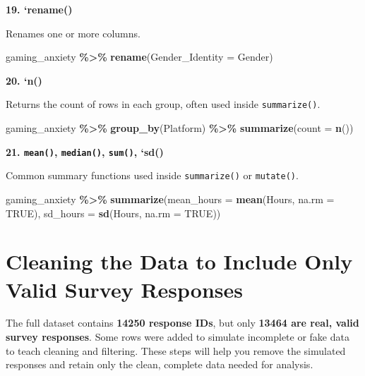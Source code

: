 \documentclass[
]{book}
\newenvironment{Shaded}{\begin{snugshade}}{\end{snugshade}}
\newcommand{\AttributeTok}[1]{\textcolor[rgb]{0.13,0.29,0.53}{#1}}
\newcommand{\ConstantTok}[1]{\textcolor[rgb]{0.56,0.35,0.01}{#1}}
\newcommand{\FunctionTok}[1]{\textcolor[rgb]{0.13,0.29,0.53}{\textbf{#1}}}
\newcommand{\NormalTok}[1]{#1}
\newcommand{\SpecialCharTok}[1]{\textcolor[rgb]{0.81,0.36,0.00}{\textbf{#1}}}
\begin{document}
\textbf{19. `rename()}

Renames one or more columns.

\begin{Shaded}
\begin{Highlighting}[]
\NormalTok{gaming\_anxiety }\SpecialCharTok{\%\textgreater{}\%}
  \FunctionTok{rename}\NormalTok{(}\AttributeTok{Gender\_Identity =}\NormalTok{ Gender)}
\end{Highlighting}
\end{Shaded}

\textbf{20. `n()}

Returns the count of rows in each group, often used inside \texttt{summarize()}.

\begin{Shaded}
\begin{Highlighting}[]
\NormalTok{gaming\_anxiety }\SpecialCharTok{\%\textgreater{}\%}
  \FunctionTok{group\_by}\NormalTok{(Platform) }\SpecialCharTok{\%\textgreater{}\%}
  \FunctionTok{summarize}\NormalTok{(}\AttributeTok{count =} \FunctionTok{n}\NormalTok{())}
\end{Highlighting}
\end{Shaded}

\textbf{21. \texttt{mean()}, \texttt{median()}, \texttt{sum()}, `sd()}

Common summary functions used inside \texttt{summarize()} or \texttt{mutate()}.

\begin{Shaded}
\begin{Highlighting}[]
\NormalTok{gaming\_anxiety }\SpecialCharTok{\%\textgreater{}\%}
  \FunctionTok{summarize}\NormalTok{(}\AttributeTok{mean\_hours =} \FunctionTok{mean}\NormalTok{(Hours, }\AttributeTok{na.rm =} \ConstantTok{TRUE}\NormalTok{),}
            \AttributeTok{sd\_hours =} \FunctionTok{sd}\NormalTok{(Hours, }\AttributeTok{na.rm =} \ConstantTok{TRUE}\NormalTok{))}
\end{Highlighting}
\end{Shaded}

\section{Cleaning the Data to Include Only Valid Survey Responses}\label{cleaning-the-data-to-include-only-valid-survey-responses}

The full dataset contains \textbf{14250 response IDs}, but only \textbf{13464 are real, valid survey responses}. Some rows were added to simulate incomplete or fake data to teach cleaning and filtering. These steps will help you remove the simulated responses and retain only the clean, complete data needed for analysis.
\end{document}
